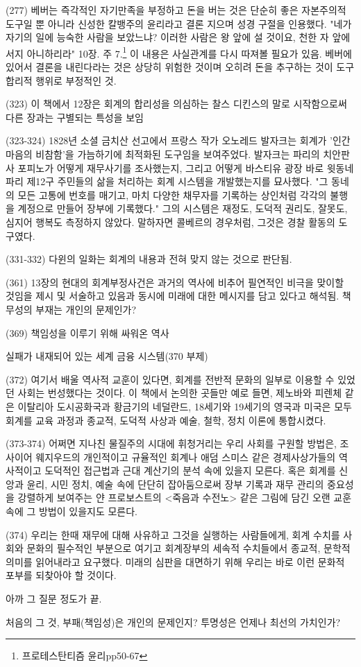 \documentclass[11pt, a4paper]{article}
\begin{document}
(277) 베버는 즉각적인 자기만족을 부정하고 돈을 버는 것은 단순히 좋은 자본주의적 도구일 뿐 아니라 신성한 칼뱅주의 윤리라고 결론 지으며 성경 구절을 인용했다. "네가 자기의 일에 능숙한 사람을 보았느냐? 이러한 사람은 왕 앞에 설 것이요, 천한 자 앞에 서지 아니하리라" 10장. 주 7.\footnote{프로테스탄티즘 윤리pp50-67} 이 내용은 사실관계를 다시 따져볼 필요가 있음. 베버에 있어서 결론을 내린다라는 것은 상당히 위험한 것이며 오히려 돈을 추구하는 것이 도구합리적 행위로 부정적인 것.

(323) 이 책에서 12장은 회계의 합리성을 의심하는 찰스 디킨스의 말로 시작함으로써 다른 장과는 구별되는 특성을 보임

(323-324) 1828년 소셜 금치산 선고에서 프랑스 작가 오노레드 발자크는 회계가 '인간 마음의 비참함'을 가늠하기에 최적화된 도구임을 보여주었다. 발자크는 파리의 치안판사 포피노가 어떻게 재무사기를 조사했는지, 그리고 어떻게 바스티유 광장 바로 윗동네 파리 제12구 주민들의 삶을 처리하는 회계 시스템을 개발했는지를 묘사했다. "그 동네의 모든 고통에 번호를 매기고, 마치 다양한 채무자를 기록하는 상인처럼 각각의 불행을 계정으로 만들어 장부에 기록했다." 그의 시스템은 재정도, 도덕적 권리도, 잘못도, 심지어 행복도 측정하지 않았다. 말하자면 콜베르의 경우처럼, 그것은 경찰 활동의 도구였다.

(331-332) 다윈의 일화는 회계의 내용과 전혀 맞지 않는 것으로 판단됨.

(361) 13장의 현대의 회계부정사건은 과거의 역사에 비추어 필연적인 비극을 맞이할 것임을 제시 및 서술하고 있음과 동시에 미래에 대한 메시지를 담고 있다고 해석됨. 책무성의 부재는 개인의 문제인가? 

(369) 책임성을 이루기 위해 싸워온 역사

실패가 내재되어 있는 세계 금융 시스템(370 부제)

(372) 여기서 배울 역사적 교훈이 있다면, 회계를 전반적 문화의 일부로 이용할 수 있었던 사회는 번성했다는 것이다. 이 책에서 논의한 곳들만 예로 들면, 제노바와 피렌체 같은 이탈리아 도시공화국과 황금기의 네덜란드, 18세기와 19세기의 영국과 미국은 모두 회계를 교육 과정과 종교적, 도덕적 사상과 예술, 철학, 정치 이론에 통합시켰다.

(373-374) 어쩌면 지나친 물질주의 시대에 휘청거리는 우리 사회를 구원할 방법은, 조사이어 웨지우드의 개인적이고 규율적인 회계나 애덤 스미스 같은 경제사상가들의 역사적이고 도덕적인 접근법과 근대 계산기의 분석 속에 있을지 모른다. 혹은 회계를 신앙과 윤리, 시민 정치, 예술 속에 단단히 잡아둠으로써 장부 기록과 재무 관리의 중요성을 강렬하게 보여주는 얀 프로보스트의 <죽음과 수전노> 같은 그림에 담긴 오랜 교훈 속에 그 방법이 있을지도 모른다.

(374) 우리는 한때 재무에 대해 사유하고 그것을 실행하는 사람들에게, 회계 수치를 사회와 문화의 필수적인 부분으로 여기고 회계장부의 세속적 수치들에서 종교적, 문학적 의미를 읽어내라고 요구했다. 미래의 심판을 대면하기 위해 우리는 바로 이런 문화적 포부를 되찾아야 할 것이다.

아까 그 질문 정도가 끝.

처음의 그 것, 부패(책임성)은 개인의 문제인지? 투명성은 언제나 최선의 가치인가?
\end{document}
